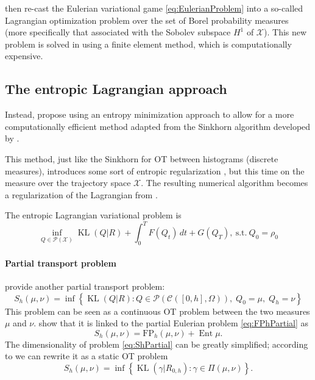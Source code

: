 \documentclass{article}
\newcommand{\calC}{\mathcal{C}}
\newcommand{\calP}{\mathcal{P}}
\newcommand{\calX}{\mathcal{X}}
\newcommand{\suchthat}{\mathrm{s.t.}}
\DeclareMathOperator{\Ent}{Ent}
\DeclareMathOperator{\KL}{KL}
\begin{document}
\textcite{benamou:hal-01295299,benamou2015lagrangian} then re-cast the Eulerian variational game \eqref{eq:EulerianProblem} into a so-called Lagrangian optimization problem over the set of Borel probability measures (more specifically that associated with the Sobolev subspace $H^1$ of $\calX$). This new problem is solved in \cite{benamou:hal-01295299} using a finite element method, which is computationally expensive.




\subsection{The entropic Lagrangian approach}

Instead, \textcite{benamou2018entropy} propose using an entropy minimization approach to allow for a more computationally efficient method adapted from the Sinkhorn algorithm \cite{cuturi2013sinkhorn} developed by \citeauthor{cuturi2013sinkhorn}.

This method, just like the Sinkhorn for OT between histograms (discrete measures), introduces some sort of entropic regularization \cite{benamou2018entropy}, but this time on the measure over the trajectory space $\calX$. The resulting numerical algorithm becomes a regularization of the Lagrangian from \cite{benamou:hal-01295299,benamou2015lagrangian}.

The entropic Lagrangian variational problem is
\begin{equation}\label{eq:EntropyLagrangianPb}
\inf_{Q\in\calP(\calX)}
\KL(Q|R) + \int_0^T F(Q_t)\,dt + G(Q_T),\
\suchthat\ Q_0 = \rho_0
\end{equation}

\paragraph{Partial transport problem} \citeauthor{benamou2018entropy} provide another partial transport problem:
\begin{equation}\label{eq:ShPartial}
   	S_h(\mu, \nu) =
   	\inf\left\{
   		\KL(Q|R) : Q\in\calP(\calC([0,h], \Omega)),
   		\; Q_0 = \mu,\; Q_h = \nu
   	\right\}
\end{equation}
This problem can be seen as a continuous OT problem between the two measures $\mu$ and $\nu$. \textcite{benamou2018entropy} show that it is linked to the partial Eulerian problem \eqref{eq:FPhPartial} as
\[
   	S_h(\mu,\nu) = \mathrm{FP}_h(\mu,\nu) + \Ent \mu.
\]
The dimensionality of problem \eqref{eq:ShPartial} can be greatly simplified; according to \cite{benamou2018entropy} we can rewrite it as a static OT problem
\begin{equation}
   	S_h(\mu, \nu) = \inf\left\{ \KL(\gamma | R_{0,h}) : \gamma \in \Pi(\mu, \nu) \right\}.
\end{equation}
\end{document}
